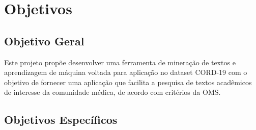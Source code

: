 \documentclass[
	12pt,				%
	a4paper,			%
	english,			%
	brazil,				%
	]{article}
\begin{document}

\section{Objetivos}



\subsection{Objetivo Geral}

	Este projeto prop\~oe desenvolver uma ferramenta de minera\c c\~ ao de textos e aprendizagem de m\' aquina voltada para aplica\c c\~ ao no dataset CORD-19 com o objetivo de fornecer uma aplica\c c\~ ao que facilita a pesquisa de textos acad\^ emicos de interesse da comunidade m\' edica, de acordo com crit\' erios da OMS.


\subsection{Objetivos Espec\' ificos}
\end{document}

